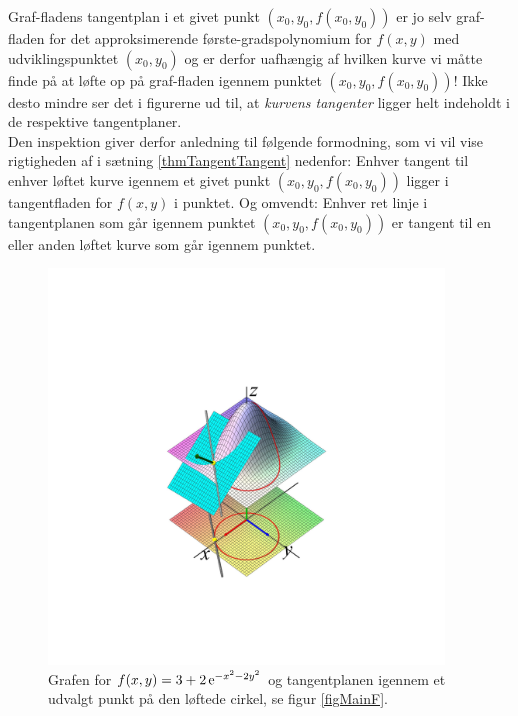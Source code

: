 \begin{aha}
Graf-fladens tangentplan i et givet punkt $(x_{0}, y_{0}, f(x_{0}, y_{0}))$ er jo selv graf-fladen for det approksimerende første-gradspolynomium for $f(x,y)$ med udviklingspunktet $(x_{0},y_{0})$ og er derfor uafhængig af hvilken kurve vi måtte finde på at løfte op på graf-fladen igennem punktet $(x_{0}, y_{0}, f(x_{0}, y_{0}))$! Ikke desto mindre ser det i figurerne ud til, at \emph{kurvens tangenter} ligger helt indeholdt i de respektive tangentplaner. \\

Den inspektion giver derfor anledning til følgende formodning, som vi vil vise rigtigheden af i sætning \ref{thmTangentTangent} nedenfor: Enhver tangent til enhver løftet kurve igennem et givet punkt $(x_{0}, y_{0}, f(x_{0}, y_{0}))$ ligger i tangentfladen for $f(x, y)$ i punktet. Og omvendt: Enhver ret linje i tangentplanen som går igennem punktet  $(x_{0}, y_{0}, f(x_{0}, y_{0}))$ er tangent til en eller anden løftet kurve som går igennem punktet.
\end{aha}

\begin{figure}[ht]
\centerline{ \includegraphics[height=105mm]{plotTangFull02Bneg.pdf}}
\begin{center}
\caption{Grafen for $f(x,y) = 3 +  2\,\mathrm{e}^{-x^{2} - 2y^{2}}$ og tangentplanen igennem et udvalgt punkt på den løftede cirkel, se figur \ref{figMainF}.} \label{figMainFTplanerA}
\end{center}
\end{figure}

